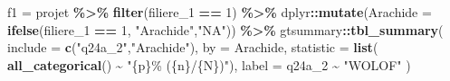 \documentclass[
]{article}
\newenvironment{Shaded}{\begin{snugshade}}{\end{snugshade}}
\newcommand{\AttributeTok}[1]{\textcolor[rgb]{0.13,0.29,0.53}{#1}}
\newcommand{\DecValTok}[1]{\textcolor[rgb]{0.00,0.00,0.81}{#1}}
\newcommand{\FunctionTok}[1]{\textcolor[rgb]{0.13,0.29,0.53}{\textbf{#1}}}
\newcommand{\NormalTok}[1]{#1}
\newcommand{\OtherTok}[1]{\textcolor[rgb]{0.56,0.35,0.01}{#1}}
\newcommand{\SpecialCharTok}[1]{\textcolor[rgb]{0.81,0.36,0.00}{\textbf{#1}}}
\newcommand{\StringTok}[1]{\textcolor[rgb]{0.31,0.60,0.02}{#1}}
\begin{document}
\begin{Shaded}
\begin{Highlighting}[]
\NormalTok{f1 }\OtherTok{=}\NormalTok{ projet }\SpecialCharTok{\%\textgreater{}\%}
\FunctionTok{filter}\NormalTok{(filiere\_1 }\SpecialCharTok{==} \DecValTok{1}\NormalTok{) }\SpecialCharTok{\%\textgreater{}\%}
\NormalTok{dplyr}\SpecialCharTok{::}\FunctionTok{mutate}\NormalTok{(}\AttributeTok{Arachide =} \FunctionTok{ifelse}\NormalTok{(filiere\_1 }\SpecialCharTok{==} \DecValTok{1}\NormalTok{, }\StringTok{"Arachide"}\NormalTok{,}\StringTok{"NA"}\NormalTok{)) }\SpecialCharTok{\%\textgreater{}\%}
\NormalTok{gtsummary}\SpecialCharTok{::}\FunctionTok{tbl\_summary}\NormalTok{(}
\AttributeTok{include =} \FunctionTok{c}\NormalTok{(}\StringTok{"q24a\_2"}\NormalTok{,}\StringTok{"Arachide"}\NormalTok{),}
\AttributeTok{by =}\NormalTok{ Arachide,}
\AttributeTok{statistic =} \FunctionTok{list}\NormalTok{( }\FunctionTok{all\_categorical}\NormalTok{() }\SpecialCharTok{\textasciitilde{}} \StringTok{"\{p\}\% (\{n\}/\{N\})"}\NormalTok{),}
\AttributeTok{label =}\NormalTok{ q24a\_2 }\SpecialCharTok{\textasciitilde{}} \StringTok{"WOLOF"}
\NormalTok{)}


\end{Highlighting}
\end{Shaded}
\end{document}
